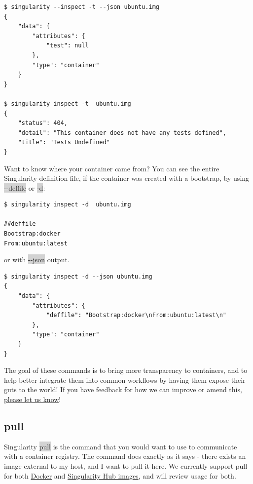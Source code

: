 \documentclass[a4paper]{article}
\newcounter{subsubsubsection}[subsubsection]
\begin{document}
\begin{lstlisting}[frame=single]
$ singularity --inspect -t --json ubuntu.img
{
    "data": {
        "attributes": {
            "test": null
        },
        "type": "container"
    }
}

$ singularity inspect -t  ubuntu.img
{
    "status": 404,
    "detail": "This container does not have any tests defined",
    "title": "Tests Undefined"
}
\end{lstlisting}
	
	Want to know where your container came from? You can see the entire Singularity definition file, if the container was created with a bootstrap, by using \colorbox{lightgray}{-{}-deffile} or \colorbox{lightgray}{-d}:
	
\begin{lstlisting}[frame=single]
$ singularity inspect -d  ubuntu.img

##deffile
Bootstrap:docker
From:ubuntu:latest
\end{lstlisting}	
	
or with \colorbox{lightgray}{-{}-json} output.

\begin{lstlisting}[frame=single]
$ singularity inspect -d --json ubuntu.img
{
    "data": {
        "attributes": {
            "deffile": "Bootstrap:docker\nFrom:ubuntu:latest\n"
        },
        "type": "container"
    }
}

\end{lstlisting}

The goal of these commands is to bring more transparency to containers, and to help better integrate them into common workflows by having them expose their guts to the world! If you have feedback for how we can improve or amend this, \href{https://github.com/singularityware/singularity/issues}{please let us know}!


\subsection{pull}
\label{sec:pull}

Singularity \colorbox{lightgray}{pull} is the command that you would want to use to communicate with a container registry. The command does exactly as it says - there exists an image external to my host, and I want to pull it here. We currently support pull for both \href{https://hub.docker.com/}{Docker} and \href{https://singularity-hub.org/}{Singularity Hub images}, and will review usage for both.\\[0.1in]
\end{document}
